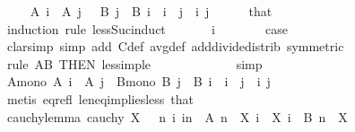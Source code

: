 \begin{isabellebody}
\ \ \isamarkupfalse%
\ \ {\isachardoublequoteopen}A\ i\ {\isasymle}\ A\ j\ {\isasymand}\ \ B\ j\ {\isasymle}\ B\ i{\isachardoublequoteclose}\ \ {\isachardoublequoteopen}i\ {\isacharless}{\kern0pt}\ j{\isachardoublequoteclose}\ \ i\ j\isanewline
\ \ \ \ \isamarkupfalse%
\ that\isanewline
\ \ \isamarkupfalse%
\ {\isacharparenleft}{\kern0pt}induction\ rule{\isacharcolon}{\kern0pt}\ less{\isacharunderscore}{\kern0pt}Suc{\isacharunderscore}{\kern0pt}induct{\isacharparenright}{\kern0pt}\isanewline
\ \ \ \ \isamarkupfalse%
\ {\isacharparenleft}{\kern0pt}{}\ i{\isacharparenright}{\kern0pt}\isanewline
\ \ \ \ \isamarkupfalse%
\ \isamarkupfalse%
\ {\isacharquery}{\kern0pt}case\isanewline
\ \ \ \ \ \ \isamarkupfalse%
\ {\isacharparenleft}{\kern0pt}clarsimp\ simp\ add{\isacharcolon}{\kern0pt}\ C{\isacharunderscore}{\kern0pt}def\ avg{\isacharunderscore}{\kern0pt}def\ add{\isacharunderscore}{\kern0pt}divide{\isacharunderscore}{\kern0pt}distrib\ {\isacharbrackleft}{\kern0pt}symmetric{\isacharbrackright}{\kern0pt}{\isacharparenright}{\kern0pt}\isanewline
\ \ \ \ \ \ \isamarkupfalse%
\ {\isacharparenleft}{\kern0pt}rule\ AB\ {\isacharbrackleft}{\kern0pt}THEN\ less{\isacharunderscore}{\kern0pt}imp{\isacharunderscore}{\kern0pt}le{\isacharbrackright}{\kern0pt}{\isacharparenright}{\kern0pt}\isanewline
\ \ \ \ \ \ \isamarkupfalse%
\ \ \isanewline
\ \ \isamarkupfalse%
\ simp\isanewline
\ \ \isamarkupfalse%
\ \isamarkupfalse%
\ A{\isacharunderscore}{\kern0pt}mono{\isacharcolon}{\kern0pt}\ {\isachardoublequoteopen}A\ i\ {\isasymle}\ A\ j{\isachardoublequoteclose}\ \ B{\isacharunderscore}{\kern0pt}mono{\isacharcolon}{\kern0pt}\ {\isachardoublequoteopen}B\ j\ {\isasymle}\ B\ i{\isachardoublequoteclose}\ \ {\isachardoublequoteopen}i\ {\isasymle}\ j{\isachardoublequoteclose}\ \ i\ j\isanewline
\ \ \ \ \isamarkupfalse%
\ {\isacharparenleft}{\kern0pt}metis\ eq{\isacharunderscore}{\kern0pt}refl\ le{\isacharunderscore}{\kern0pt}neq{\isacharunderscore}{\kern0pt}implies{\isacharunderscore}{\kern0pt}less\ that{\isacharparenright}{\kern0pt}{\isacharplus}{\kern0pt}\isanewline
\ \ \isamarkupfalse%
\ cauchy{\isacharunderscore}{\kern0pt}lemma{\isacharcolon}{\kern0pt}\ {\isachardoublequoteopen}cauchy\ X{\isachardoublequoteclose}\ \ {\isacharasterisk}{\kern0pt}{\isacharcolon}{\kern0pt}\ {\isachardoublequoteopen}{\isasymAnd}n\ i{\isachardot}{\kern0pt}\ i{\isasymge}n\ {\isasymLongrightarrow}\ A\ n\ {\isasymle}\ X\ i\ {\isasymand}\ X\ i\ {\isasymle}\ B\ n{\isachardoublequoteclose}\ \ X\isanewline

\end{isabellebody}
